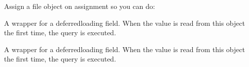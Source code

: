 \documentclass[letterpaper,10pt,spanish]{sphinxmanual}
\begin{document}
\begin{fulllineitems}
\begin{fulllineitems}
\begin{sphinxVerbatim}[commandchars=\\\{\}]
   
  
\end{sphinxVerbatim}

\sphinxAtStartPar
Assign a file object on assignment so you can do:

\begin{sphinxVerbatim}[commandchars=\\\{\}]
   
      
\end{sphinxVerbatim}

\end{fulllineitems}



\begin{fulllineitems}

\pysigstartsignatures
{}
\pysigstopsignatures
\sphinxAtStartPar
A wrapper for a deferred\sphinxhyphen{}loading field. When the value is read from this
object the first time, the query is executed.

\end{fulllineitems}



\begin{fulllineitems}

\pysigstartsignatures
{}
\pysigstopsignatures
\sphinxAtStartPar
A wrapper for a deferred\sphinxhyphen{}loading field. When the value is read from this
object the first time, the query is executed.

\end{fulllineitems}



\begin{fulllineitems}


\end{fulllineitems}
\end{fulllineitems}
\end{document}
